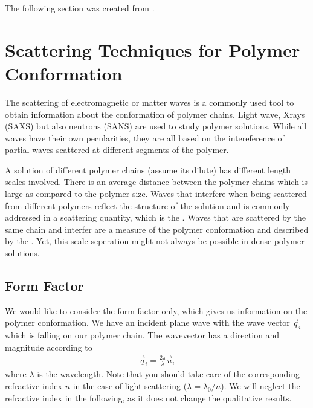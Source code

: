 \documentclass[letterpaper,10pt,english]{sphinxmanual}
\begin{document}
\sphinxAtStartPar
{}



\sphinxAtStartPar
The following section was created from .


\chapter{Scattering Techniques for Polymer Conformation}
\label{\detokenize{notebooks/L23/1_Scattering:Scattering-Techniques-for-Polymer-Conformation}}\label{\detokenize{notebooks/L23/1_Scattering::doc}}
\sphinxAtStartPar
The scattering of electromagnetic or matter waves is a commonly used tool to obtain information about the conformation of polymer chains. Light wave, X\sphinxhyphen{}rays (SAXS) but also neutrons (SANS) are used to study polymer solutions. While all waves have their own pecularities, they are all based on the intereference of partial waves scattered at different segments of the polymer.

\sphinxAtStartPar
A solution of different polymer chains (assume its dilute) has different length scales involved. There is an average distance between the polymer chains which is large as compared to the polymer size. Waves that interfere when being scattered from different polymers reflect the structure of the solution and is commonly addressed in a scattering quantity, which is the . Waves that are scattered by the same chain and interfer are a measure of the polymer conformation and
described by the . Yet, this scale seperation might not always be possible in dense polymer solutions.


\section{Form Factor}
\label{\detokenize{notebooks/L23/1_Scattering:Form-Factor}}
\sphinxAtStartPar
We would like to consider the form factor only, which gives us information on the polymer conformation. We have an incident plane wave with the wave vector \(\vec{q}_i\) which is falling on our polymer chain. The wavevector has a direction and magnitude according to
\begin{equation*}
\begin{split}\vec{q}_i=\frac{2\pi}{\lambda}\vec{u}_i\end{split}
\end{equation*}
\sphinxAtStartPar
where \(\lambda\) is the wavelength. Note that you should take care of the corresponding refractive index \(n\) in the case of light scattering (\(\lambda=\lambda_0/n\)). We will neglect the refractive index in the following, as it does not change the qualitative results.
\end{document}
